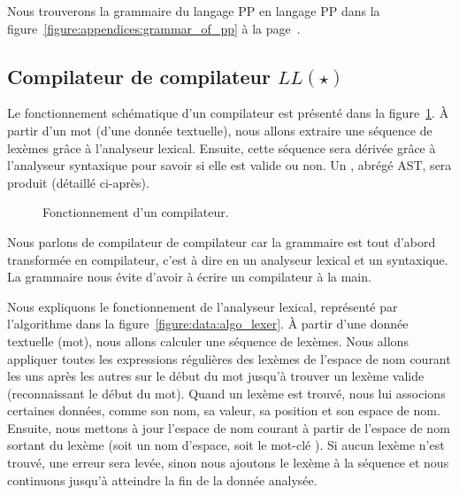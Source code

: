 Nous trouverons la grammaire du langage PP en langage PP dans la
figure~\ref{figure:appendices:grammar_of_pp} à la
page~\pageref{figure:appendices:grammar_of_pp}.

\subsection{Compilateur de compilateur $LL(\star)$}
\label{subsection:data:compiler-compiler}

Le fonctionnement schématique d'un compilateur est présenté dans la
figure~\ref{figure:data:compiler}. À partir d'un {\strong mot} (d'une donnée
textuelle), nous allons extraire une {\strong séquence} de lexèmes grâce à
l'analyseur {\strong lexical}. Ensuite, cette séquence sera {\strong dérivée}
grâce à l'analyseur {\strong syntaxique} pour savoir si elle est valide ou non.
Un , abrégé AST, sera produit (détaillé
ci-après).
%
\begin{figure}


\caption{\label{figure:data:compiler} Fonctionnement d'un compilateur.}

\end{figure}
%
Nous parlons de {\strong compilateur de compilateur} car la grammaire est tout
d'abord transformée en compilateur, c'est à dire en un analyseur lexical et un
syntaxique. La grammaire nous évite d'avoir à écrire un compilateur à la main.

Nous expliquons le fonctionnement de l'analyseur lexical, représenté par
l'algorithme dans la figure~\ref{figure:data:algo_lexer}. À partir d'une donnée
textuelle (mot), nous allons calculer une séquence de lexèmes. Nous allons
appliquer toutes les expressions régulières des lexèmes de l'espace de nom
courant les uns après les autres sur le début du mot jusqu'à trouver un lexème
valide (reconnaissant le début du mot). Quand un lexème est trouvé, nous lui
associons certaines données, comme son nom, sa valeur, sa position et son espace
de nom. Ensuite, nous mettons à jour l'espace de nom courant à partir de
l'espace de nom sortant du lexème (soit un nom d'espace, soit le mot-clé
). Si aucun lexème n'est trouvé, une erreur sera
levée, sinon nous ajoutons le lexème à la séquence et nous continuons jusqu'à
atteindre la fin de la donnée analysée.

